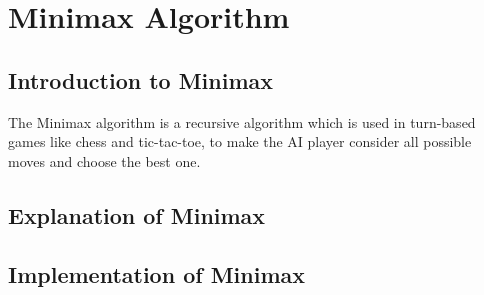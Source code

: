 \section{Minimax Algorithm} 
\label{sec:Minimax Algorithm}

\subsection{Introduction to Minimax}
\label{subsec:Introduction to Minimax}
The Minimax algorithm is a recursive algorithm which is used in turn-based games like chess and tic-tac-toe, 
to make the AI player consider all possible moves and choose the best one.

\subsection{Explanation of Minimax}
\label{subsec:Explanation of Minimax}

\subsection{Implementation of Minimax}
\label{subsec:Implementation of Minimax}

\clearpage
